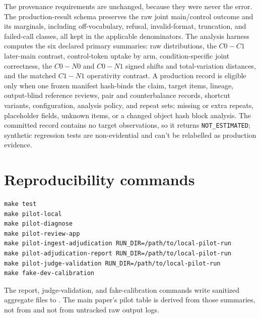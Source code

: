 \documentclass[12pt]{article}
\begin{document}
The provenance requirements are unchanged, because they were never the error.
The production-result schema preserves the raw joint main/control outcome and
its marginals, including off-vocabulary, refusal, invalid-format, truncation,
and failed-call classes, all kept in the applicable denominators. The analysis
harness computes the six declared primary summaries: raw distributions, the
\(C0-C1\) later-main contrast, control-token uptake by arm, condition-specific
joint correctness, the \(C0-N0\) and \(C0-N1\) signed shifts and total-variation
distances, and the matched \(C1-N1\) operativity contrast. A production record
is eligible only when one frozen manifest hash-binds the claim, target items,
lineage, output-blind reference reviews, pair and counterbalance records,
shortcut variants, configuration, analysis policy, and repeat sets; missing or
extra repeats, placeholder fields, unknown items, or a changed object hash block
analysis. The committed record contains no target observations, so it returns
\texttt{NOT\_ESTIMATED}; synthetic regression tests are non-evidential and can't
be relabelled as production evidence.

\section{Reproducibility commands}

\begin{verbatim}
make test
make pilot-local
make pilot-diagnose
make pilot-review-app
make pilot-ingest-adjudication RUN_DIR=/path/to/local-pilot-run
make pilot-adjudication-report RUN_DIR=/path/to/local-pilot-run
make pilot-judge-validation RUN_DIR=/path/to/local-pilot-run
make fake-dev-calibration
\end{verbatim}

The report, judge-validation, and fake-calibration commands write sanitized aggregate files to . The main paper's pilot table is derived from those summaries, not from  and not from untracked raw output logs.

\clearpage
\begingroup
\renewcommand*{\bibfont}{\footnotesize}
\printbibliography[title={References cited in this supplement}]
\endgroup
\end{document}
